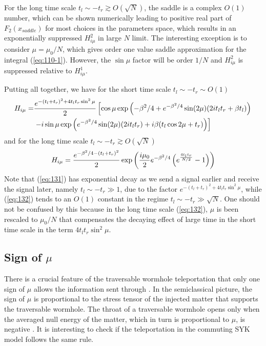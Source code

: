 \documentclass[11pt]{article}
\renewcommand{\>}{\rangle}
\newcommand{\<}{\langle}
\begin{document}
For the long time scale $t_{l}\sim-t_{r}\gtrsim O(\sqrt{N})$, the
saddle is a complex $O(1)$ number, which can be shown numerically
leading to positive real part of $F_{2}(x_{saddle})$ for most choices
in the parameters space, which results in an exponentially suppressed
$H_{i\mu}^{2}$ in large $N$ limit. The interesting exception is
to consider $\mu=\mu_{0}/N$, which gives order one value saddle approximation
for the integral (\ref{eq:110-1}). However, the $\sin\mu$ factor
will be order $1/N$ and $H_{i\mu}^{2}$ is suppressed relative to
$H_{i\mu}^{1}$. 

Putting all together, we have for the short time scale $t_{l}\sim-t_{r}\sim O(1)$
\begin{align}
H_{i\mu}= & \frac{e^{-(t_{l}+t_{r})^{2}+4t_{l}t_{r}\sin^{2}\mu}}{2}\left[\cos\mu\exp\left(-\beta^{2}/4+e^{-\beta^{2}/4}\sin(2\mu)(2it_{l}t_{r}+\beta t_{l})\right)\right.\nonumber \\
 & \left.-i\sin\mu\exp\left(e^{-\beta^{2}/4}\sin(2\mu)(2it_{l}t_{r})+i\beta(t_{l}\cos2\mu+t_{r})\right)\right]\label{eq:131}
\end{align}
and for the long time scale $t_{l}\sim-t_{r}\gtrsim O(\sqrt{N})$
\begin{equation}
H_{i\mu}=\frac{e^{-\beta^{2}/4-(t_{l}+t_{r})^{2}}}{2}\exp\left(\frac{i\mu_{0}}{2}e^{-\beta^{2}/4}\left(e^{\frac{4t_{l}t_{r}}{N/2}}-1\right)\right)\label{eq:132}
\end{equation}
Note that (\ref{eq:131}) has exponential decay as we send a signal
earlier and receive the signal later, namely $t_{l}\sim-t_{r}\gg1$,
due to the factor $e^{-(t_{l}+t_{r})^{2}+4t_{l}t_{r}\sin^{2}\mu}$,
while (\ref{eq:132}) tends to an $O(1)$ constant in the regime $t_{l}\sim-t_{r}\gg\sqrt{N}$.
One should not be confused by this because in the long time scale
(\ref{eq:132}), $\mu$ is been rescaled to $\mu_{0}/N$ that compensates
the decaying effect of large time in the short time scale in the term
$4t_{l}t_{r}\sin^{2}\mu$.

\subsection{Sign of $\mu$\label{subsec:Sign-of}}

There is a crucial feature of the traversable wormhole teleportation
that only one sign of $\mu$ allows the information sent through \cite{Gao:2019nyj}.
In the semiclassical picture, the sign of $\mu$ is proportional to
the stress tensor of the injected matter that supports the traversable
wormhole. The throat of a traversable wormhole opens only when the averaged
null energy of the matter, which in turn is proportional to $\mu$,
is negative \cite{Gao:2016bin}. It is interesting to check if the teleportation
in the commuting SYK model follows the same rule.
\end{document}
